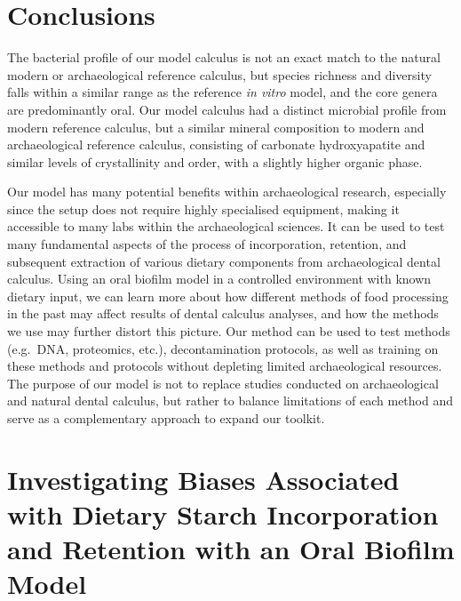 \documentclass[
  letterpaper,
]{book}
\begin{document}

\hypertarget{conclusions}{%
\chapter{Conclusions}\label{conclusions}}

The bacterial profile of our model calculus is not an exact match to the
natural modern or archaeological reference calculus, but species
richness and diversity falls within a similar range as the reference
\emph{in vitro} model, and the core genera are predominantly oral. Our
model calculus had a distinct microbial profile from modern reference
calculus, but a similar mineral composition to modern and archaeological
reference calculus, consisting of carbonate hydroxyapatite and similar
levels of crystallinity and order, with a slightly higher organic phase.

Our model has many potential benefits within archaeological research,
especially since the setup does not require highly specialised
equipment, making it accessible to many labs within the archaeological
sciences. It can be used to test many fundamental aspects of the process
of incorporation, retention, and subsequent extraction of various
dietary components from archaeological dental calculus. Using an oral
biofilm model in a controlled environment with known dietary input, we
can learn more about how different methods of food processing in the
past may affect results of dental calculus analyses, and how the methods
we use may further distort this picture. Our method can be used to test
methods (e.g.~DNA, proteomics, etc.), decontamination protocols, as well
as training on these methods and protocols without depleting limited
archaeological resources. The purpose of our model is not to replace
studies conducted on archaeological and natural dental calculus, but
rather to balance limitations of each method and serve as a
complementary approach to expand our toolkit.


\hypertarget{investigating-biases-associated-with-dietary-starch-incorporation-and-retention-with-an-oral-biofilm-model}{%
\chapter{Investigating Biases Associated with Dietary Starch
Incorporation and Retention with an Oral Biofilm
Model}\label{investigating-biases-associated-with-dietary-starch-incorporation-and-retention-with-an-oral-biofilm-model}}
\end{document}
